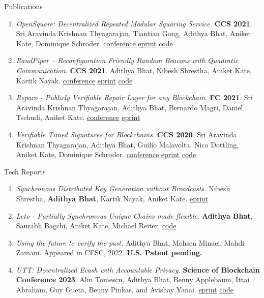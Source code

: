 \documentclass{resume}
\begin{document}
\begin{rSection}{Publications}
\begin{enumerate}
\item \emph{OpenSquare: Decentralized Repeated Modular Squaring Service.} \textbf{CCS 2021}. Sri Aravinda Krishnan Thyagarajan, Tiantian Gong, Adithya Bhat, Aniket Kate, Dominique Schroder. \href{https://dl.acm.org/doi/10.1145/3460120.3484809}{conference} \href{https://eprint.iacr.org/2021/1273}{eprint} \href{https://github.com/verifiable-timed-signatures/OpenSquare}{code}
\item \label{org6f1ea28} \emph{RandPiper – Reconfiguration Friendly Random Beacons with Quadratic Communication.} \textbf{CCS 2021}. Adithya Bhat, Nibesh Shrestha, Aniket Kate, Kartik Nayak. \href{https://dl.acm.org/doi/abs/10.1145/3460120.3484574}{conference} \href{https://eprint.iacr.org/2020/1590.pdf}{eprint} \href{https://github.com/zhtluo/randpiper-rs}{code}
\item \label{orgc38a75b} \emph{Reparo - Publicly Verifiable Repair Layer for any Blockchain.} \textbf{FC 2021}. Sri Aravinda Krishnan Thyagarajan, Adithya Bhat, Bernardo Magri, Daniel Tschudi, Aniket Kate. \href{https://fc21.ifca.ai/papers/119.pdf}{conference} \href{https://arxiv.org/abs/2001.00486}{eprint}
\item \label{org7082af7} \emph{Verifiable Timed Signatures for Blockchains.} \textbf{CCS 2020}. Sri Aravinda Krishnan Thyagarajan, Adithya Bhat, Guilio Malavolta, Nico Dottling, Aniket Kate, Dominique Schroder. \href{https://dl.acm.org/doi/10.1145/3372297.3417263}{conference} \href{https://eprint.iacr.org/2020/1563.pdf}{eprint} \href{https://github.com/verifiable-timed-signatures/liblhtlp}{code}
\end{enumerate}
\end{rSection}
\begin{rSection}{Tech Reports}
\label{sec:org08f2376}
\begin{enumerate}
\item \label{org2d6e9a8} \emph{Synchronous Distributed Key Generation without Broadcasts.} Nibesh Shrestha, \textbf{Adithya Bhat}, Kartik Nayak, Aniket Kate. \href{https://eprint.iacr.org/2021/1635}{eprint}
\item \label{org430e6a2} \emph{Leto - Partially Synchronous Unique Chains made flexible.} \textbf{Adithya Bhat}, Saurabh Bagchi, Aniket Kate, Michael Reiter. \href{https://github.com/libdist-rs/leto-rs}{code}
\item \label{org0ea0e41} \emph{Using the future to verify the past.} Adithya Bhat, Mohsen Minaei, Mahdi Zamani. Appeared in CESC, 2022. \textbf{U.S. Patent pending.}
\item \label{org9389cc0} \emph{UTT: Decentralized Ecash with Accountable Privacy.} \textbf{Science of Blockchain Conference 2023}. Alin Tomescu, Adithya Bhat, Benny Applebaum, Ittai Abraham, Guy Gueta, Benny Pinkas, and Avishay Yanai. \href{https://eprint.iacr.org/2022/452}{eprint} \href{https://github.com/definitelyNotFBI/utt}{code}
\end{enumerate}
\end{rSection}
\end{document}
